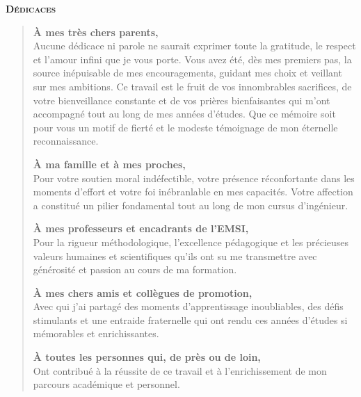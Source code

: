 \thispagestyle{empty}
\begin{center}
    \vspace*{2cm}
    {\Large\bfseries\scshape\color{focpgreendark} Dédicaces}
    \vspace{1cm}
\end{center}

\begin{quote}
\em{}

\noindent\textbf{À mes très chers parents,}\\
Aucune dédicace ni parole ne saurait exprimer toute la gratitude, le respect et l'amour infini que je vous porte. Vous avez été, dès mes premiers pas, la source inépuisable de mes encouragements, guidant mes choix et veillant sur mes ambitions. Ce travail est le fruit de vos innombrables sacrifices, de votre bienveillance constante et de vos prières bienfaisantes qui m'ont accompagné tout au long de mes années d'études. Que ce mémoire soit pour vous un motif de fierté et le modeste témoignage de mon éternelle reconnaissance.

\vspace{0.8cm}

\noindent\textbf{À ma famille et à mes proches,}\\
Pour votre soutien moral indéfectible, votre présence réconfortante dans les moments d'effort et votre foi inébranlable en mes capacités. Votre affection a constitué un pilier fondamental tout au long de mon cursus d'ingénieur.

\vspace{0.8cm}

\noindent\textbf{À mes professeurs et encadrants de l'EMSI,}\\
Pour la rigueur méthodologique, l'excellence pédagogique et les précieuses valeurs humaines et scientifiques qu'ils ont su me transmettre avec générosité et passion au cours de ma formation.

\vspace{0.8cm}

\noindent\textbf{À mes chers amis et collègues de promotion,}\\
Avec qui j'ai partagé des moments d'apprentissage inoubliables, des défis stimulants et une entraide fraternelle qui ont rendu ces années d'études si mémorables et enrichissantes.

\vspace{0.8cm}

\noindent\textbf{À toutes les personnes qui, de près ou de loin,}\\
Ont contribué à la réussite de ce travail et à l'enrichissement de mon parcours académique et personnel.

\end{quote}

\vfill
\newpage

